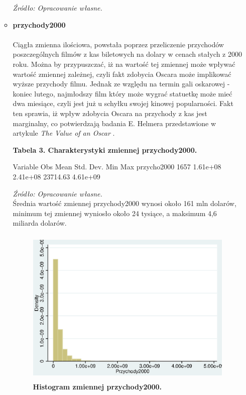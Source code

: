 \begin{itemize}
\begin{itemize}
\textit{\footnotesize{Źródło: Opracowanie własne.}} \\
  	
  	\item[\ding{228}]\textbf{przychody2000} \\
  	\\Ciągła zmienna ilościowa, powstała poprzez przeliczenie przychodów  poszczególnych filmów z kas biletowych na dolary w cenach stałych z 2000 roku. Można by przypuszczać, iż na wartość tej zmiennej może wpływać wartość zmiennej zależnej, czyli fakt zdobycia Oscara może implikować wyższe przychody filmu. Jednak ze względu na termin gali oskarowej - koniec lutego, najmłodszy film który może wygrać statuetkę może mieć dwa miesiące, czyli jest już u schyłku swojej kinowej popularności. Fakt ten sprawia, iż wpływ zdobycia Oscara na przychody z kas jest marginalny, co potwierdzają badania E. Helmera przedstawione w artykule \textit{The Value of an Oscar} \cite{helmer13}.\\
 
\vspace{3cm}
	
{\centering
\textbf{Tabela 3. Charakterystyki zmiennej przychody2000.}}
\begin{stlog}	
	
    Variable {\VBAR}       Obs        Mean    Std. Dev.       Min        Max
przycho{\tytilde}2000 {\VBAR}      1657    1.61e+08    2.41e+08   23714.63   4.61e+09
{\smallskip}

	
\end{stlog}

\textit{\footnotesize{Źródło: Opracowanie własne.}} \\

Średnia wartość zmiennej przychody2000 wynosi około 161 mln dolarów, minimum tej zmiennej wyniosło około 24 tysiące, a maksimum 4,6 miliarda dolarów.

\vspace{0.5cm}

\begin{figure}[h]
\begin{centering}
  \includegraphics[height=3in]{Rysunki//przychody2000}
    \caption{\textbf{Histogram zmiennej przychody2000.}}
\end{centering}
\end{figure}


\end{itemize}
\end{itemize}
